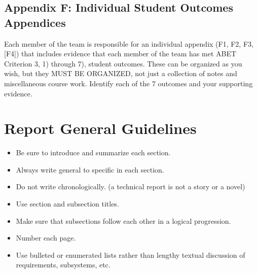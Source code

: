 \documentclass[12pt]{article}
\begin{document}
\subsection*{Appendix F: Individual Student Outcomes Appendices}
Each member of the team is responsible for an individual appendix (F1, F2, F3, [F4]) that includes evidence that each member of the team has met ABET Criterion 3, 1) through 7), student outcomes. These can be organized as you wish, but they MUST BE ORGANIZED, not just a collection of notes and miscellaneous course work. Identify each of the 7 outcomes and your supporting evidence.

\section*{Report General Guidelines}
\begin{itemize}[noitemsep]
    \item Be sure to introduce and summarize each section.
    \item Always write general to specific in each section.
    \item Do not write chronologically. (a technical report is not a story or a novel)
    \item Use section and subsection titles.
    \item Make sure that subsections follow each other in a logical progression.
    \item Number each page.
    \item Use bulleted or enumerated lists rather than lengthy textual discussion of requirements, subsystems, etc.
\end{itemize}
\end{document}
